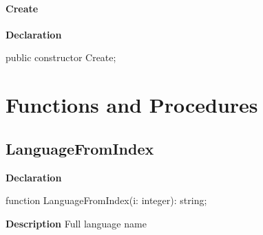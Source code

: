 \documentclass{report}
\newif\ifpdf
\begin{document}
\paragraph*{Create}\hspace*{\fill}

\label{PasDoc_Languages.TPasDocLanguages-Create}
\begin{list}{}{
\setlength{\itemindent}{0cm}
\setlength{\listparindent}{0cm}
\setlength{\leftmargin}{\evensidemargin}
\addtolength{\leftmargin}{\tmplength}
\settowidth{\labelsep}{X}
\addtolength{\leftmargin}{\labelsep}
\setlength{\labelwidth}{\tmplength}
}
\item[\textbf{Declaration}\hfill]
\ifpdf
\begin{flushleft}
\fi
\begin{ttfamily}
public constructor Create;\end{ttfamily}

\ifpdf
\end{flushleft}
\fi

\end{list}
\section{Functions and Procedures}
\ifpdf
\subsection*{\large{\textbf{LanguageFromIndex}}\normalsize\hspace{1ex}\hrulefill}
\else
\subsection*{LanguageFromIndex}
\fi
\label{PasDoc_Languages-LanguageFromIndex}
\begin{list}{}{
\setlength{\itemindent}{0cm}
\setlength{\listparindent}{0cm}
\setlength{\leftmargin}{\evensidemargin}
\addtolength{\leftmargin}{\tmplength}
\settowidth{\labelsep}{X}
\addtolength{\leftmargin}{\labelsep}
\setlength{\labelwidth}{\tmplength}
}
\item[\textbf{Declaration}\hfill]
\ifpdf
\begin{flushleft}
\fi
\begin{ttfamily}
function LanguageFromIndex(i: integer): string;\end{ttfamily}

\ifpdf
\end{flushleft}
\fi

\par
\item[\textbf{Description}]
Full language name

\end{list}
\ifpdf
\end{document}
